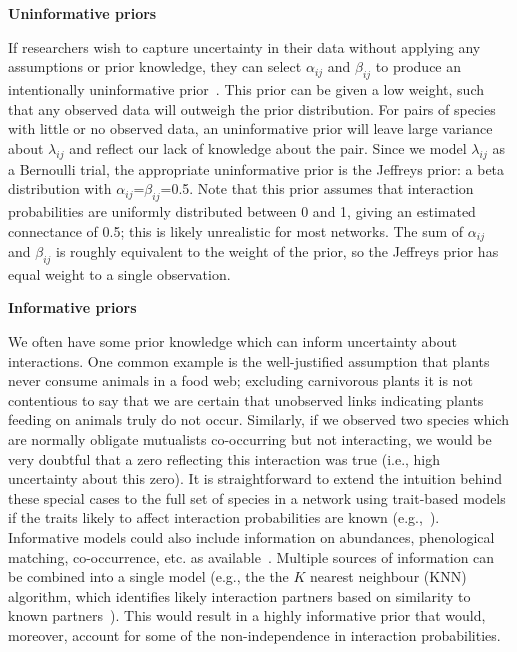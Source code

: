\documentclass[12pt]{article}
\begin{document}
\begin{spacing}{2.0}
      \textbf{Uninformative priors}

        If researchers wish to capture uncertainty in their data without applying any assumptions or prior knowledge, they can select $\alpha_{ij}$ and $\beta_{ij}$ to produce an intentionally uninformative prior~\citep{Leyland2005,Berger2006}. This prior can be given a low weight, such that any observed data will outweigh the prior distribution. For pairs of species with little or no observed data, an uninformative prior will leave large variance about $\lambda_{ij}$ and reflect our lack of knowledge about the pair. Since we model $\lambda_{ij}$ as a Bernoulli trial, the appropriate uninformative prior is the Jeffreys prior: a beta distribution with $\alpha_{ij}$=$\beta_{ij}$=0.5. Note that this prior assumes that interaction probabilities are uniformly distributed between 0 and 1, giving an estimated connectance of 0.5; this is likely unrealistic for most networks. The sum of $\alpha_{ij}$ and $\beta_{ij}$ is roughly equivalent to the weight of the prior, so the Jeffreys prior has equal weight to a single observation. 


      \textbf{Informative priors}

        We often have some prior knowledge which can inform uncertainty about interactions. One common example is the well-justified assumption that plants never consume animals in a food web; excluding carnivorous plants it is not contentious to say that we are certain that unobserved links indicating plants feeding on animals truly do not occur. Similarly, if we observed two species which are normally obligate mutualists co-occurring but not interacting, we would be very doubtful that a zero reflecting this interaction was true (i.e., high uncertainty about this zero). It is straightforward to extend the intuition behind these special cases to the full set of species in a network using trait-based models if the traits likely to affect interaction probabilities are known (e.g.,~\citet{Gravel2013,Bartomeus2016,Weinstein2017}). Informative models could also include information on abundances, phenological matching, co-occurrence, etc. as available~\citep{Jordano2016,Weinstein2017a,Graham2018,Gravel2018}. Multiple sources of information can be combined into a single model (e.g., the the $K$ nearest neighbour (KNN) algorithm, which identifies likely interaction partners based on similarity to known partners~\citep{DesjardinsProulx2017}). This would result in a highly informative prior that would, moreover, account for some of the non-independence in interaction probabilities. 



\end{spacing}
\end{document}
